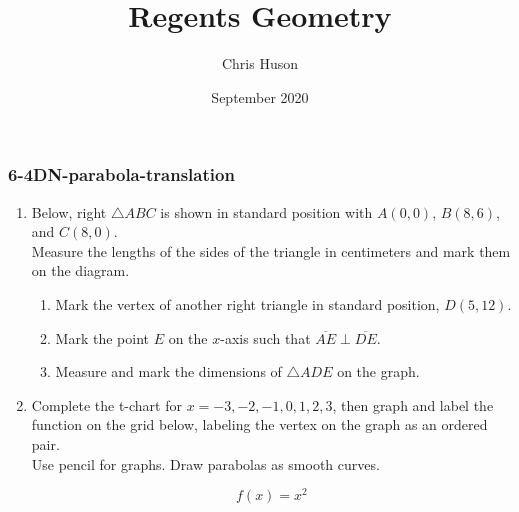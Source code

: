 \documentclass[12pt, twoside]{article}
\title{Regents Geometry}
\author{Chris Huson}
\date{September 2020}
\begin{document}
\subsubsection*{6-4DN-parabola-translation}
\begin{enumerate}
\item Below, right $\triangle ABC$ is shown in standard position with $A(0, 0)$, $B(8, 6)$, and $C(8,0)$.\\[0.25cm]
     Measure the lengths of the sides of the triangle in centimeters and mark them on the diagram.
    \begin{center}
    \end{center}
      \vspace{1cm}
    \begin{enumerate}
      \item Mark the vertex of another right triangle in standard position, $D(5,12)$.
      \item Mark the point $E$ on the $x$-axis such that $\overline{AE} \perp \overline{DE}$.
      \item Measure and mark the dimensions of $\triangle ADE$ on the graph.
    \end{enumerate}

\newpage 
\item Complete the t-chart for $x= -3,-2,-1,0,1,2,3$, then graph and label the function on the grid below, labeling the vertex on the graph as an ordered pair.\\[0.25cm]
  Use pencil for graphs. Draw parabolas as smooth curves.

  \[f(x) = x^2\]


\end{enumerate}
\end{document}
